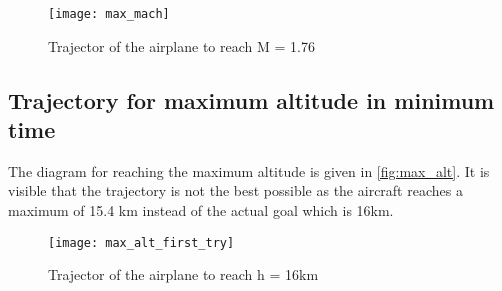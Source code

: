 \begin{figure}[H]
    \centering
    \hspace*{-2cm}
    \texttt{[image: max\_mach]}
    \caption{Trajector of the airplane to reach M = 1.76}
    \label{fig:max_mach}
\end{figure}

\subsection{Trajectory for maximum altitude in minimum time}
The diagram for reaching the maximum altitude is given in \ref{fig:max_alt}.
It is visible that the trajectory is not the best possible as the aircraft reaches a maximum of 15.4 km
instead of the actual goal which is 16km.

\begin{figure}[H]
    \centering
    \hspace*{-2cm}
    \texttt{[image: max\_alt\_first\_try]}
    \caption{Trajector of the airplane to reach h = 16km}
    \label{fig:max_alt_first_try}
\end{figure}
